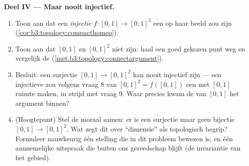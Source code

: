\begin{problem}
\medskip
\noindent\textbf{Deel IV --- Maar nooit injectief.}
\begin{enumerate}[resume]
  \item Toon aan dat een  \emph{injectie} $f \colon [0,1]
        \to [0,1]^2$ een  op haar beeld zou zijn
        (\cref{cor:b3:topology:compacthomeo}).
  \item Toon aan dat $[0,1]$ en $[0,1]^2$ niet  zijn:
        haal een goed gekozen punt weg en vergelijk de 
        (\cref{met:b3:topology:connectargument}).
  \item Besluit: een  surjectie $[0,1] \to [0,1]^2$ kan
        nooit injectief zijn --- een injectieve zou volgens vraag
        8 van $[0,1]^2 = f([0,1])$ een met $[0,1]$ 
        ruimte maken, in strijd met vraag 9. Waar precies kwam de
         van $[0,1]$ het argument binnen?
  \item (Hoogtepunt) Stel de moraal samen: er is een 
        surjectie maar geen  bijectie $[0,1] \to
        [0,1]^2$. Wat zegt dit over ``dimensie'' als topologisch
        begrip? Formuleer nauwkeurig één stelling die in dit
        probleem bewezen is, en één aannemelijke uitspraak die
        buiten ons gereedschap blijft (de invariantie van het
        gebied).
\end{enumerate}


\end{problem}
